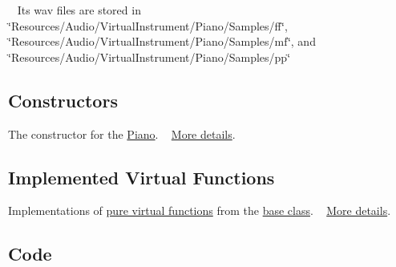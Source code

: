 ~\newline
 Its wav files are stored in \char`\"{}\+Resources/\+Audio/\+Virtual\+Instrument/\+Piano/\+Samples/ff\char`\"{}, \char`\"{}\+Resources/\+Audio/\+Virtual\+Instrument/\+Piano/\+Samples/mf\char`\"{}, and \char`\"{}\+Resources/\+Audio/\+Virtual\+Instrument/\+Piano/\+Samples/pp\char`\"{}\hypertarget{group___doc_piano_DocPianoConstruct}{}\subsection{Constructors}\label{group___doc_piano_DocPianoConstruct}
The constructor for the \hyperlink{class_piano}{Piano}. ~\newline
 \hyperlink{group___piano_construct}{More details}.\hypertarget{group___doc_piano_DocPianoVirtFunc}{}\subsection{Implemented Virtual Functions}\label{group___doc_piano_DocPianoVirtFunc}
Implementations of \hyperlink{group___v_i_base_virt_func}{pure virtual functions} from the \hyperlink{group___v_i_base}{base class}. ~\newline
 \hyperlink{group___piano_virt_func}{More details}.\hypertarget{group___doc_piano_DocPianoCode}{}\subsection{Code}\label{group___doc_piano_DocPianoCode}


